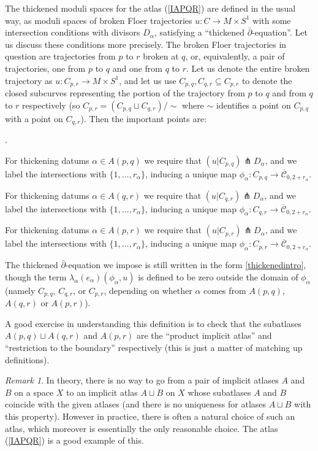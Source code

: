 \documentclass[12pt]{article}
\theoremstyle{definition}
\theoremstyle{remark}
\newtheorem{remark}[theorem]{Remark}
\numberwithin{equation}{subsection}
\newcommand{\Cbar}{\overline{\mathcal C}}
\newcommand{\delbar}{\bar\partial}
\newcounter{rcounti}
\newenvironment{rlist}{\begin{list}{\roman{rcounti}.}{\usecounter{rcounti}
\setlength\itemsep{0pt}
\setlength\labelsep{4pt}
\setlength\labelwidth{16pt}
\setlength\leftmargin{32pt}
\setlength\listparindent{0pt}
\setlength\parsep{0pt}
\setlength\parskip{0pt}
\setlength\partopsep{0pt}
\setlength\rightmargin{0pt}
\setlength\topsep{0pt}
\setlength\itemindent{0pt}
}}{\end{list}}
\begin{document}
The thickened moduli spaces for the atlas (\ref{IAPQR}) are defined in the usual way, as moduli spaces of broken Floer trajectories $u:C\to M\times S^1$ with some intersection conditions with divisors $D_\alpha$, satisfying a ``thickened $\delbar$-equation''.  Let us discuss these conditions more precisely.  The broken Floer trajectories in question are trajectories from $p$ to $r$ broken at $q$, or, equivalently, a pair of trajectories, one from $p$ to $q$ and one from $q$ to $r$.  Let us denote the entire broken trajectory as $u:C_{p,r}\to M\times S^1$, and let us use $C_{p,q},C_{q,r}\subseteq C_{p,r}$ to denote the closed subcurves representing the portion of the trajectory from $p$ to $q$ and from $q$ to $r$ respectively (so $C_{p,r}=(C_{p,q}\sqcup C_{q,r})/\sim$ where $\sim$ identifies a point on $C_{p,q}$ with a point on $C_{q,r}$).  Then the important points are:
\begin{rlist}
\item For thickening datums $\alpha\in A(p,q)$ we require that $(u|C_{p,q})\pitchfork D_\alpha$, and we label the intersections with $\{1,\ldots,r_\alpha\}$, inducing a unique map $\phi_\alpha:C_{p,q}\to\Cbar_{0,2+r_\alpha}$.
\item For thickening datums $\alpha\in A(q,r)$ we require that $(u|C_{q,r})\pitchfork D_\alpha$, and we label the intersections with $\{1,\ldots,r_\alpha\}$, inducing a unique map $\phi_\alpha:C_{q,r}\to\Cbar_{0,2+r_\alpha}$.
\item For thickening datums $\alpha\in A(p,r)$ we require that $(u|C_{p,r})\pitchfork D_\alpha$, and we label the intersections with $\{1,\ldots,r_\alpha\}$, inducing a unique map $\phi_\alpha:C_{p,r}\to\Cbar_{0,2+r_\alpha}$.
\item The thickened $\delbar$-equation we impose is still written in the form \eqref{thickenedintro}, though the term $\lambda_\alpha(e_\alpha)(\phi_\alpha,u)$ is defined to be zero outside the domain of $\phi_\alpha$ (namely $C_{p,q}$, $C_{q,r}$, or $C_{p,r}$, depending on whether $\alpha$ comes from $A(p,q)$, $A(q,r)$ or $A(p,r)$).
\end{rlist}
A good exercise in understanding this definition is to check that the subatlases $A(p,q)\sqcup A(q,r)$ and $A(p,r)$ are the ``product implicit atlas'' and ``restriction to the boundary'' respectively (this is just a matter of matching up definitions).

\begin{remark}
In theory, there is no way to go from a pair of implicit atlases $A$ and $B$ on a space $X$ to an implicit atlas $A\sqcup B$ on $X$ whose subatlases $A$ and $B$ coincide with the given atlases (and there is no uniqueness for atlases $A\sqcup B$ with this property).  However in practice, there is often a natural choice of such an atlas, which moreover is essentially the only reasonable choice.  The atlas (\ref{IAPQR}) is a good example of this.
\end{remark}
\end{document}
